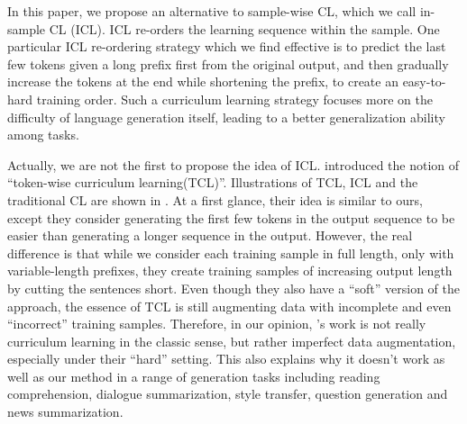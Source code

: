 
In this paper, we propose an alternative to sample-wise CL, which we call 
in-sample CL (ICL). 
ICL re-orders the learning sequence within the sample. 
One particular ICL re-ordering strategy which we find effective is to predict the 
last few tokens given a long prefix first from the original output, and then gradually increase the tokens
at the end while shortening the prefix, to create an easy-to-hard training
order. Such a curriculum learning strategy focuses more on the difficulty of language generation itself,
leading to a better generalization ability among tasks.

Actually, we are not the first to propose the idea of ICL.
\citet{liang-etal-2021-token-wise} introduced the notion of ``token-wise curriculum
learning(TCL)''. %
Illustrations of TCL, ICL and the traditional CL are shown in .
At a first glance,
their idea is similar to ours, except they consider generating the first few tokens
in the output sequence to be easier than generating a longer sequence in the output. 
However, the real difference is that while we consider each training sample in full
length, only with variable-length prefixes, they create training samples of increasing
output length by cutting the sentences short. %
Even though they also have a ``soft'' version of the approach, the essence of TCL
is still augmenting data
with incomplete and even
``incorrect'' training samples. %
Therefore, in our opinion, \citeauthor{liang-etal-2021-token-wise}'s work is not really curriculum learning in the classic sense, but rather imperfect data augmentation, especially under their ``hard'' setting.
This also explains why it doesn't work as well as our method in a range of generation tasks 
including reading comprehension,
dialogue summarization, style transfer, question generation and 
news summarization. 


